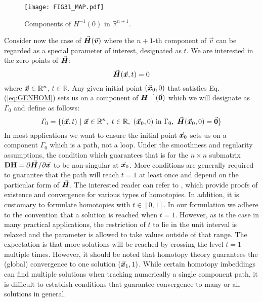 \begin{figure}[t]
	
	\centering
	\texttt{[image: FIG31\_MAP.pdf]}
	\caption{Components of $H^{-1}(0)$ in $\mathbb{R}^{n+1}$.}
	\label{fig:FIG31}
\end{figure}

Consider now the case of $\vec{\bm{H}}(\vec{\bm{v}})$ where the $n+1$-th component of 
$\vec{v}$ can be regarded as a special parameter of 
interest, designated as $t$. We are interested in the zero points of 
$\vec{\bm{H}}$:
\begin{equation}
	\vec{\bm{H}}(\vec{\bm{x}},t)=0
	\label{eq:GENHOM}
\end{equation}
\noindent where $\vec{\bm{x}}\in\mathbb{R}^n$, 
$t\in\mathbb{R}$. Any given initial point $(\vec{\bm{x}}_0,0)$ that satisfies Eq.
(\ref{eq:GENHOM}) sets us on a component of $\bm{H}^{-1}(\vec{\bm{0}})$ which we 
will
designate as $\mathit{\Gamma}_0$ and define as follows:
\begin{equation}
	\mathit{\Gamma}_0=\{(\bvec{x},t)\ |\ 
	\bvec{x}\in\mathbb{R}^n,\ t\in\mathbb{R},\ (\bvec{x}_0,0)\ \text{in}\ 
	\Gamma_0,\ \bvec{H}(\bvec{x}_0,0)=\bvec{0}\}
	\label{eq:PATH}
\end{equation}
In most applications we want to ensure the initial point $\vec{\bm{x}}_0$ sets us 
on 
a component $\mathit{\Gamma}_0$ which is a path, not a loop. Under the 
smoothness and regularity assumptions, the condition which guarantees that is 
for
the $n\times n$ submatrix $\mathbf{DH}=\partial \vec{\bm{H}}^{}/\partial \vec{\bm{x}}$ to 
be
non-singular at $\vec{\bm{x}}_0$\cite{Garcia:1980}. More conditions are generally
required to guarantee that the path will reach $t=1$ at least once and 
depend on the particular form of $\vec{\bm{H}}$. The interested reader can refer to
\cite{Allgower:2003}, which provide proofs of existence and convergence for
various types of homotopies. In addition, it is customary to formulate
homotopies with $t\in[0,1]$. In our formulation we adhere to the
convention that a solution is reached when $t=1$. However, as is the case 
in many 
practical applications, the restriction of $t$ to lie in the unit
interval is relaxed and the parameter is allowed to take values outside of that 
range. The expectation is that more solutions will be
reached by crossing the level $t=1$ multiple times. However, it should 
be noted that homotopy theory guarantees the (global) convergence 
to one solution $(\vec{\bm{x}}_1,1)$. While certain homotopy imbeddings can find 
multiple
solutions when tracking numerically a single component
path\cite{Keller:1978,Lin:1987,Sun:1995}, it is difficult to establish
conditions that guarantee convergence to many or all solutions in
general\cite{Sun:1995}. 

